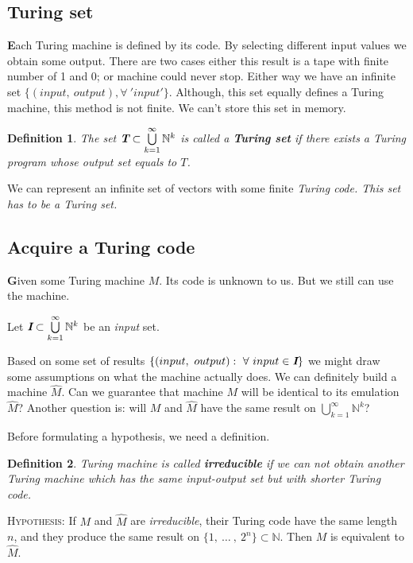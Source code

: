 \documentclass[12pt]{article}
\def\mathbi#1{\textbf{\em #1}}
\newtheorem{definition}{Definition}[section]
\begin{document}
\subsection{Turing set}
\textbf{\large E}ach Turing machine is defined by its code. By selecting different input values we obtain some output. There are two cases either this result is a tape with finite number of 1 and 0; or machine could never stop. Either way we have an infinite set $\{(input,\ output), \forall\ 'input'\}$. Although, this set equally defines a Turing machine, this method is not finite. We can't store this set in memory.

\begin{definition}
The set $\mathbi{T}\subset\bigcup\limits_{k=1}^{\infty}\mathbb{N}^k$ is called a \textbf{Turing set} if there exists a Turing program whose output set equals to $T$.
\end{definition}

We can represent an infinite set of vectors with some finite \em{Turing code}. This set has to be a \em{Turing set}.

\subsection{Acquire a Turing code}
\textbf{\large G}iven some Turing machine $M$. Its code is unknown to us. But we still can use the machine. 

Let $\mathbi{I}\subset\bigcup\limits_{k=1}^{\infty}\mathbb{N}^k$ be an \emph{input} set.

Based on some set of results $\{(input,\ output):\  \forall\ input\in \mathbi{I}\}$ we might draw some assumptions on what the machine actually does. We can definitely build a machine $\hat{M}$. Can we guarantee that machine $M$ will be identical to its emulation $\hat{M}$? Another question is: will $M$ and $\hat{M}$ have the same result on $\bigcup\limits_{k=1}^{\infty}\mathbb{N}^k$?

Before formulating a hypothesis, we need a definition.

\begin{definition}
Turing machine is called \textbf{irreducible} if we can not obtain another Turing machine which has the same input-output set but with shorter Turing code. 
\end{definition}

\textsc{Hypothesis}: If $M$ and $\hat{M}$ are \emph{irreducible}, their Turing code have the same length $n$, and they produce the same result on $\{1,\ \dots\ ,\ 2^n\}\subset\mathbb{N}$. Then $M$ is equivalent to $\hat{M}$.
\end{document}
